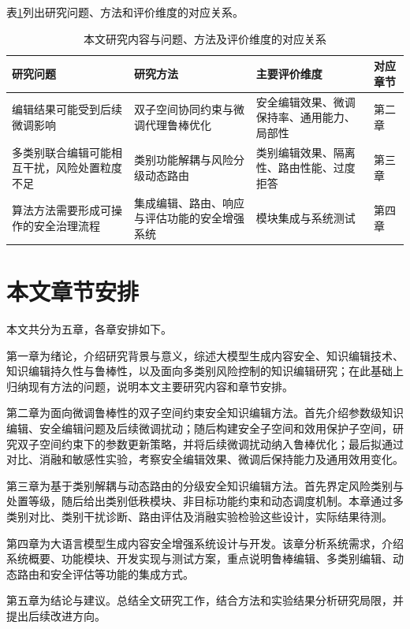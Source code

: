 表\ref{tab:chap1-framework}列出研究问题、方法和评价维度的对应关系。

\begin{table}[htbp]
  \centering
  \caption{本文研究内容与问题、方法及评价维度的对应关系}
  \label{tab:chap1-framework}
  \begin{tabular}{@{}>{\raggedright\arraybackslash}p{}>{\raggedright\arraybackslash}p{}>{\raggedright\arraybackslash}p{}l@{}}
    \hline
    研究问题 & 研究方法 & 主要评价维度 & 对应章节 \\
    \hline
    编辑结果可能受到后续微调影响 & 双子空间协同约束与微调代理鲁棒优化 & 安全编辑效果、微调保持率、通用能力、局部性 & 第二章 \\
    多类别联合编辑可能相互干扰，风险处置粒度不足 & 类别功能解耦与风险分级动态路由 & 类别编辑效果、隔离性、路由性能、过度拒答 & 第三章 \\
    算法方法需要形成可操作的安全治理流程 & 集成编辑、路由、响应与评估功能的安全增强系统 & 模块集成与系统测试 & 第四章 \\
    \hline
  \end{tabular}
\end{table}

\section{本文章节安排}

本文共分为五章，各章安排如下。

第一章为绪论，介绍研究背景与意义，综述大模型生成内容安全、知识编辑技术、知识编辑持久性与鲁棒性，以及面向多类别风险控制的知识编辑研究；在此基础上归纳现有方法的问题，说明本文主要研究内容和章节安排。

第二章为面向微调鲁棒性的双子空间约束安全知识编辑方法。首先介绍参数级知识编辑、安全编辑问题及后续微调扰动；随后构建安全子空间和效用保护子空间，研究双子空间约束下的参数更新策略，并将后续微调扰动纳入鲁棒优化；最后拟通过对比、消融和敏感性实验，考察安全编辑效果、微调后保持能力及通用效用变化。

第三章为基于类别解耦与动态路由的分级安全知识编辑方法。首先界定风险类别与处置等级，随后给出类别低秩模块、非目标功能约束和动态调度机制。本章通过多类别对比、类别干扰诊断、路由评估及消融实验检验这些设计，实际结果待测。

第四章为大语言模型生成内容安全增强系统设计与开发。该章分析系统需求，介绍系统概要、功能模块、开发实现与测试方案，重点说明鲁棒编辑、多类别编辑、动态路由和安全评估等功能的集成方式。

第五章为结论与建议。总结全文研究工作，结合方法和实验结果分析研究局限，并提出后续改进方向。
